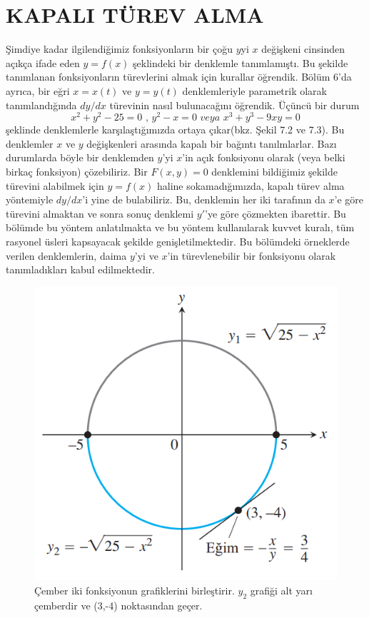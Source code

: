 \chapter{\protect KAPALI TÜREV ALMA}
Şimdiye kadar ilgilendiğimiz fonksiyonların bir çoğu $y$yi $x$ değişkeni cinsinden açıkça ifade eden $y=f(x)$ şeklindeki bir denklemle tanımlamıştı. Bu şekilde tanımlanan fonksiyonların türevlerini almak için kurallar öğrendik. Bölüm 6'da ayrıca, bir eğri $x=x(t)$ ve $y=y(t)$ denklemleriyle parametrik olarak tanımlandığında $dy/dx$ türevinin nasıl bulunacağını öğrendik. Üçüncü bir durum
	\begin{equation*}
	x^2+y^2-25=0 \textit{    ,   } y^2-x=0 \textit{    veya  }  x^3+y^3-9xy=0
	\end{equation*}
şeklinde denklemlerle karşılaştığımızda ortaya çıkar(bkz. Şekil 7.2 ve 7.3). Bu denklemler $x$ ve $y$ değişkenleri arasında kapalı bir bağıntı tanılmlarlar. Bazı durumlarda böyle bir denklemden $y$'yi $x$'in açık fonksiyonu olarak (veya belki birkaç fonksiyon) çözebiliriz. Bir $F(x,y)=0$ denklemini bildiğimiz şekilde türevini alabilmek için $y=f(x)$ haline sokamadığımızda, kapalı türev alma yöntemiyle $dy/dx$'i yine de bulabiliriz. Bu, denklemin her iki tarafının da $x$'e göre türevini almaktan ve sonra sonuç denklemi $y'$'ye göre çözmekten ibarettir. Bu bölümde bu yöntem anlatılmakta ve bu yöntem kullanılarak kuvvet kuralı, tüm rasyonel üsleri kapsayacak şekilde genişletilmektedir. Bu bölümdeki örneklerde verilen denklemlerin, daima $y$'yi ve $x$'in türevlenebilir bir fonksiyonu olarak tanımladıkları kabul edilmektedir.

\begin{figure}[H]
	\centering
	\includegraphics[width=0.5\linewidth]{kapaliturev1.png}
	\caption{Çember iki fonksiyonun grafiklerini birleştirir. $y_2$ grafiği alt yarı çemberdir ve (3,-4) noktasından geçer.}
	\label{fig:ornekresim}
\end{figure}
